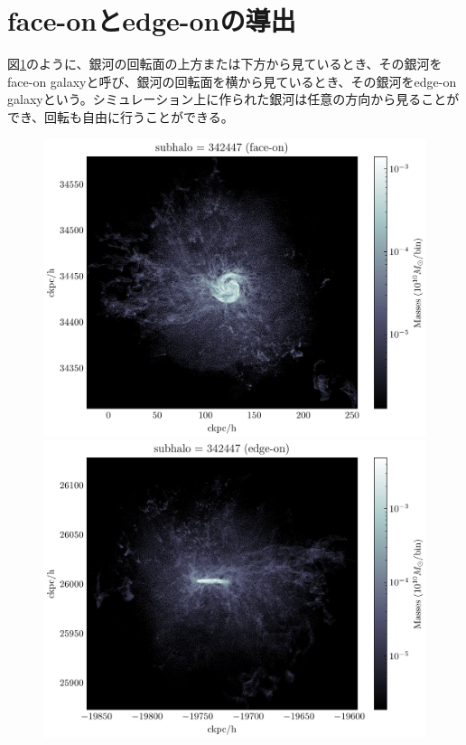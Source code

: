 \section{face-onとedge-onの導出}
図\ref{fig:faceon,edge-on}のように、銀河の回転面の上方または下方から見ているとき、その銀河をface-on galaxyと呼び、銀河の回転面を横から見ているとき、その銀河をedge-on galaxyという。シミュレーション上に作られた銀河は任意の方向から見ることができ、回転も自由に行うことができる。

\begin{figure}[htbp]
	\centering
	\begin{minipage}[b]{0.48\linewidth}
		\centering
		\includegraphics[width=\linewidth]{./pic/face-on}
	\end{minipage}
	\begin{minipage}[b]{0.48\linewidth}
		\centering
		\includegraphics[width=\linewidth]{./pic/edge-on}
	\end{minipage}
	\caption{}
	\label{fig:faceon,edge-on}
\end{figure}

